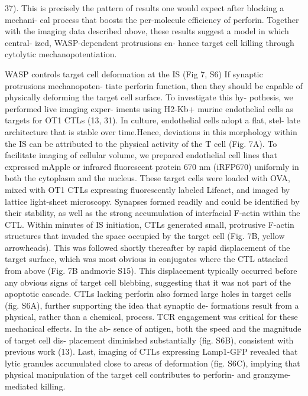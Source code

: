 37). This is precisely the pattern of results one would expect after blocking a mechani- cal process that boosts the per-molecule efficiency of perforin. Together with the imaging data described above, these results suggest a model in which central- ized, WASP-dependent protrusions en- hance target cell killing through cytolytic mechanopotentiation.


WASP controls target cell deformation at the IS (Fig 7, S6)
If synaptic protrusions mechanopoten- tiate perforin function, then they should be capable of physically deforming the target cell surface. To investigate this hy- pothesis, we performed live imaging exper- iments using H2-Kb+ murine endothelial cells as targets for OT1 CTLs (13, 31). In culture, endothelial cells adopt a flat, stel- late architecture that is stable over time.Hence, deviations in this morphology within the IS can be attributed to the physical activity of the T cell (Fig. 7A). To facilitate imaging of cellular volume, we prepared endothelial cell lines that expressed mApple or infrared fluorescent protein 670 nm (iRFP670) uniformly in both the cytoplasm and the nucleus. These target cells were loaded with OVA, mixed with OT1 CTLs expressing fluorescently labeled Lifeact, and imaged by lattice light-sheet microscopy. Synapses formed readily and could be identified by their stability, as well as the strong accumulation of interfacial F-actin within the CTL. Within minutes of IS initiation, CTLs generated small, protrusive F-actin structures that invaded the space occupied by the target cell (Fig. 7B, yellow arrowheads). This was followed shortly thereafter by rapid displacement of the target surface, which was most obvious in conjugates where the CTL attacked from above (Fig. 7B andmovie S15). This displacement typically occurred before any obvious signs of target cell blebbing, suggesting that it was not part of the apoptotic cascade. CTLs lacking perforin also formed large holes in target cells (fig. S6A), further supporting the idea that synaptic de- formations result from a physical, rather than a chemical, process. TCR engagement was critical for these mechanical effects. In the ab- sence of antigen, both the speed and the magnitude of target cell dis- placement diminished substantially (fig. S6B), consistent with previous work (13). Last, imaging of CTLs expressing Lamp1-GFP revealed that lytic granules accumulated close to areas of deformation (fig. S6C), implying that physical manipulation of the target cell contributes to perforin- and granzyme-mediated killing.
